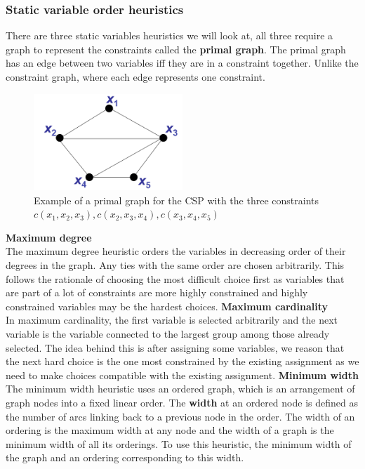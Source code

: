\documentclass[CS4402-Notes.tex]{subfiles}
\begin{document}
\subsubsection{Static variable order heuristics}
There are three static variables heuristics we will look at, all three require a graph to represent the constraints called the \textbf{primal graph}. The primal graph has an edge between two variables iff they are in a constraint together. Unlike the constraint graph, where each edge represents one constraint.
\begin{figure}[H]
  \centering
  \includegraphics[width=0.5\textwidth, keepaspectratio]{imgs/primal-graph.png}
  \caption{Example of a primal graph for the CSP with the three constraints $c(x_1,x_2,x_3), c(x_2,x_3,x_4), c(x_3,x_4,x_5)$}
\end{figure}
\noindent
\textbf{Maximum degree}\\
The maximum degree heuristic orders the variables in decreasing order of their degrees in the graph. Any ties with the same order are chosen arbitrarily. This follows the rationale of choosing the most difficult choice first as variables that are part of a lot of constraints are more highly constrained and highly constrained variables may be the hardest choices. 
\n
\textbf{Maximum cardinality} \\
In maximum cardinality, the first variable is selected arbitrarily and the next variable is the variable connected to the largest group among those already selected. The idea behind this is after assigning some variables, we reason that the next hard choice is the one most constrained by the existing assignment as we need to make choices compatible with the existing assignment.
\n
\textbf{Minimum width} \\
The minimum width heuristic uses an ordered graph, which is an arrangement of graph nodes into a fixed linear order. The \textbf{width} at an ordered node is defined as the number of arcs linking back to a previous node in the order. The width of an ordering is the maximum width at any node and the width of a graph is the minimum width of all its orderings. To use this heuristic, the minimum width of the graph and an ordering corresponding to this width.
\end{document}
